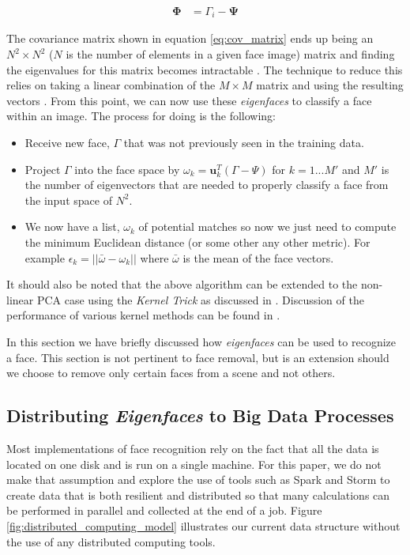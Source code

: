 \documentclass[
	submission,
	final,
	notitlepage,
	narroweqnarray,
	inline,
	twoside,
	]{ieee}
\begin{document}
\begin{align}
  \mathbf{\Phi} &= \Gamma_i - \mathbf{\Psi} \label{eq:subtract_bias}
\end{align}

The covariance matrix shown in equation \ref{eq:cov_matrix} ends up
being an $N^2 \times N^2$ ($N$ is the number of elements in a given
face image) matrix and finding the eigenvalues for
this matrix becomes intractable \cite{eigen_face_recognition}. The
technique to reduce this relies on taking a linear combination of the
$M \times M$ matrix and using the resulting vectors \cite{turk_eigen_faces}.
From this point, we can now use these \textit{eigenfaces} to classify
a face within an image. The process for doing is the following:
\begin{itemize}
  \item Receive new face, $\Gamma$ that was not previously seen in the
    training data.
  \item Project $\Gamma$ into the face space by $\omega_k = \mathbf{u}_k^T (\Gamma - \Psi)$
    for $k = 1 ... M'$ and $M'$ is the number of eigenvectors that are
    needed to properly classify a face from the input space of $N^2$.
  \item We now have a list, $\omega_k$ of potential matches so now we just need
    to compute the minimum Euclidean distance (or some other any other metric).
    For example $\epsilon_k = ||\bar{\omega} - \omega_k ||$ where $\bar{\omega}$
    is the mean of the face vectors.
\end{itemize}

It should also be noted that the above algorithm can be extended to the non-linear
PCA case using the \textit{Kernel Trick} as discussed in \cite{face_kpca}.
Discussion of the performance of various kernel methods can be found in
\cite{kernel_learning}.

In this section we have briefly discussed how \textit{eigenfaces} can be
used to recognize a face. This section is not pertinent to face removal,
but is an extension should we choose to remove only certain faces from
a scene and not others.

\subsection{Distributing \textit{Eigenfaces} to Big Data Processes}
Most implementations of face recognition rely on the fact that
all the data is located on one disk and is run on a single machine.
For this paper, we do not make that assumption and explore the use
of tools such as Spark \cite{spark} and Storm \cite{storm} to create
data that is both resilient and distributed so that many
calculations can be performed in parallel and collected at the end of a job.
Figure \ref{fig:distributed_computing_model}
illustrates our current data structure without the use of any
distributed computing tools.
\end{document}
